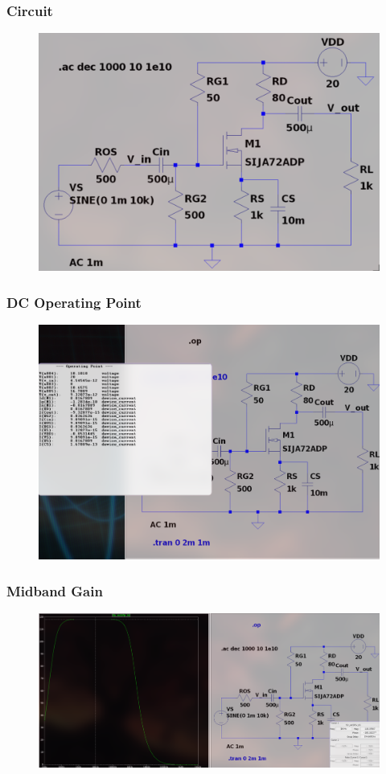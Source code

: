 \documentclass{article}
\begin{document}
\subsubsection{Circuit}
\begin{figure}[h!]
        \centering
        \includegraphics[width=0.7\linewidth]{figs/mosfet_cs_ckt.png}
    \end{figure}
\subsubsection{DC Operating Point}
\begin{figure}[h!]
        \centering
        \includegraphics[width=0.7\linewidth]{figs/mosfet_cs_op.png}
    \end{figure}
\pagebreak
\subsubsection{Midband Gain}
\begin{figure}[h!]
        \centering
        \includegraphics[width=0.7\linewidth]{figs/mosfet_cs_mb.png}
    \end{figure}
\end{document}
